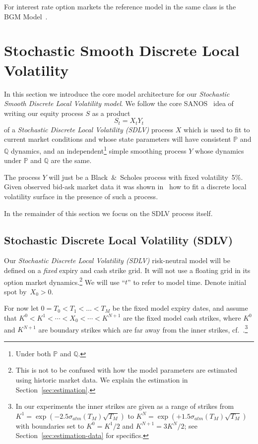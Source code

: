 \documentclass[11pt]{article}
\newcommand{\Q}{\mathbb Q}
\newcommand{\PP}{\mathbb P}
\theoremstyle{plain}
\theoremstyle{definition}
\theoremstyle{remark}
\begin{document}
For interest rate option markets the reference model in the same class is the BGM Model~\citep{BGM}. 

\section{Stochastic Smooth Discrete Local Volatility}

In this section we introduce the core model architecture for our \emph{Stochastic 
Smooth Discrete Local Volatility model}.
We follow the core SANOS~\citep{SANOS2026} idea of writing our equity process $S$ as a product
\begin{equation}
 \label{eq:S} 
  S_t = X_t Y_t 
\end{equation}
of a \emph{Stochastic Discrete Local Volatility (SDLV)} process $X$ which is used to fit to current market conditions and 
whose state parameters will have consistent $\PP$ and $\Q$ dynamics, and an independent\footnote{Under both $\PP$ and $\Q$.} simple smoothing process $Y$ whose dynamics under $\PP$ and $\Q$ are the same.

The process $Y$ will just be a Black~\&~Scholes process with fixed volatility~5\%. Given observed bid-ask market data it was shown in~\cite{SANOS2026} how to fit
a discrete local volatility surface in the presence of such a process. 

In the remainder of this section we focus on the SDLV process itself.

\subsection{Stochastic Discrete Local Volatility (SDLV)}

Our \emph{Stochastic Discrete Local Volatility (SDLV)} risk-neutral model will be defined on a \emph{fixed} expiry and cash strike grid. It will not use a floating grid in its option market dynamics.\footnote{This is not to be confused with 
how the model parameters are estimated using historic market data. We explain the estimation in Section~\ref{sec:estimation}.} We will use ``$t$'' to refer to 
model time. Denote initial spot by~$X_0>0$.

For now let $0=T_0<T_1<\dots<T_M$ be the fixed model expiry dates, and assume that $K^0<K^1<\cdots<X_0<\cdots<K^{N+1}$ are the fixed model cash strikes, where 
$K^0$ and $K^{N+1}$
are boundary strikes which are far away from the inner strikes, cf.~\cite{SANOS2026}.\footnote{In our experiments the inner strikes are given as a range of strikes
from $K^1=\exp(-2.5 \sigma_{atm}(T_M) \sqrt{T_M})$ to $K^N=\exp(+1.5 \sigma_{atm}(T_M) \sqrt{T_M})$ with boundaries set to $K^0=K^1/2$ and $K^{N+1}=3 K^N / 2$; see
Section~\ref{sec:estimation-data} for specifics.
}
\end{document}
